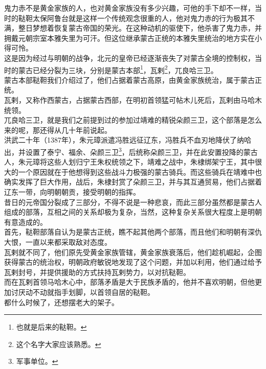 \begin{multicols}{\theparacolNo}
鬼力赤不是黄金家族的人，也对黄金家族没有多少兴趣，可他的手下却不一样，当时的鞑靼太保阿鲁台就是这样一个传统观念很重的人，他对鬼力赤的行为极其不满，整日梦想着恢复蒙古帝国的荣光。在这种动机的驱使下，他杀害了鬼力赤，并拥戴元朝宗室本雅失里为可汗。但这位继承蒙古正统的本雅失里统治的地方实在小得可怜。\\

这是因为经过与明朝的战争，北元的皇帝已经逐渐丧失了对蒙古全境的控制权，当时的蒙古已经分裂为三块，分别是蒙古本部\footnote{也就是后来的鞑靼。}，瓦剌\footnote{这个名字大家应该熟悉。}，兀良哈三卫。\\

蒙古本部鞑靼我们介绍过了，他们占据着蒙古高原，由黄金家族统治，属于蒙古正统。\\

瓦剌，又称作西蒙古，占据蒙古西部，在明初首领猛可帖木儿死后，瓦剌由马哈木统领。\\

兀良哈三卫，就是我们之前提到过的参加过靖难的精锐朵颜三卫，这个部落是怎么来的呢，那还得从几十年前说起。\\

洪武二十年（1387年），朱元璋派遣冯胜远征辽东，冯胜兵不血刃地降伏了纳哈出，并设置了泰宁、福余、朵颜三卫\footnote{军事单位。}，后统称朵颜三卫，并在此安置投降的蒙古人，朱元璋将这些人划归宁王朱权统领之下，靖难之战中，朱棣绑架宁王，其中很大的一个原因就在于他想得到这些战斗力极强的蒙古骑兵。而这些骑兵在靖难中也确实发挥了巨大作用，战后，朱棣封赏了朵颜三卫，并与其互通贸易，他们占据着辽东一带，向明朝朝贡，接受明朝的指挥。\\

昔日的元帝国分裂成了三部分，不得不说是一种悲哀，而此三部分虽然都是蒙古人组成的部落，互相之间的关系却极为复杂，当然，这种复杂关系很大程度上是明朝有意造成的。\\

首先，鞑靼部落自认为是蒙古正统，瞧不起其他两个部落，而且他们和明朝有深仇大恨，一直以来都采取敌对态度。\\

瓦剌就不同了，他们原先受黄金家族管辖，黄金家族衰落后，他们趁机崛起，企图获得蒙古的统治权，明朝政府敏锐地发现了这个问题，并加以利用，他们通过给予瓦剌封号，并提供援助的方式扶持瓦剌势力，以对抗鞑靼。\\

而在瓦剌首领马哈木心中，部落矛盾是大于民族矛盾的，他并不喜欢明朝，但他更加讨厌动不动就指手划脚，以首领自居的鞑靼。\\

都什么时候了，还想摆老大的架子。\\


\end{multicols}

